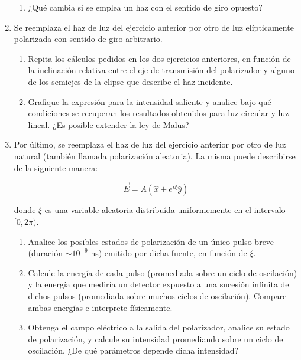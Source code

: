 \documentclass[11pt,spanish]{article}
\begin{document}
\begin{enumerate}
\begin{enumerate}
        \item ¿Qué cambia si se emplea un haz con el sentido de giro opuesto?
    \end{enumerate}


    \item Se reemplaza el haz de luz del ejercicio anterior por otro de luz
    elípticamente polarizada con sentido de giro arbitrario.
    
    \begin{enumerate}
        \item Repita los cálculos pedidos en los dos ejercicios anteriores, en
        función de la inclinación relativa entre el eje de transmisión del
        polarizador y alguno de los semiejes de la elipse que describe el haz
        incidente.
        
        \item Grafique la expresión para la intensidad saliente y analice bajo
        qué condiciones se recuperan los resultados obtenidos para luz circular
        y luz lineal. ¿Es posible extender la ley de Malus?
    \end{enumerate}
    

    \item Por último, se reemplaza el haz de luz del ejercicio anterior por otro
    de luz natural (también llamada polarización aleatoria). La misma puede
    describirse de la siguiente manera:
    
    $$\vec{E} = A(\hat{x} + e^{i \xi}\hat{y})$$
    
    donde $\xi$ es una variable aleatoria distribuída uniformemente en el
    intervalo $[0, 2 \pi)$.
    
    \begin{enumerate}
    
        \item Analice los posibles estados de polarización de un único pulso
        breve (duración $\sim 10^{-9}$ ns) emitido por dicha fuente, en función
        de $\xi$.
        
        \item Calcule la energía de cada pulso (promediada sobre un ciclo de
        oscilación) y la energía que mediría un detector expuesto a una sucesión
        infinita de dichos pulsos (promediada sobre muchos ciclos de
        oscilación). Compare ambas energías e interprete físicamente.
    
        \item Obtenga el campo eléctrico a la salida del polarizador, analice su
        estado de polarización, y calcule su intensidad promediando sobre un
        ciclo de oscilación. ¿De qué parámetros depende dicha intensidad?
        

\end{enumerate}
\end{enumerate}
\end{document}
